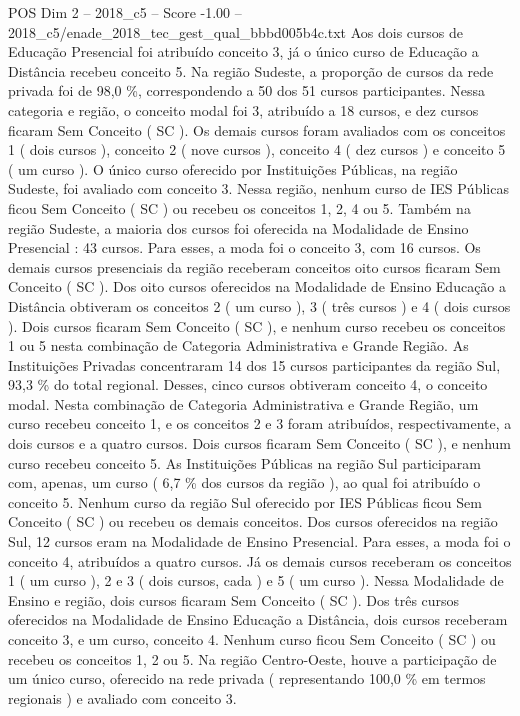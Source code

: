 \begin{textsample}{POS Dim 2 – 2018\_c5 – Score -1.00 – 2018\_c5/enade\_2018\_tec\_gest\_qual\_bbbd005b4c.txt}
Aos dois cursos de Educação Presencial foi atribuído conceito 3, já o único curso de Educação a Distância recebeu conceito 5.
Na região Sudeste, a proporção de cursos da rede privada foi de 98,0 \%, correspondendo a 50 dos 51 cursos participantes.
Nessa categoria e região, o conceito modal foi 3, atribuído a 18 cursos, e dez cursos ficaram Sem Conceito ( SC ).
Os demais cursos foram avaliados com os conceitos 1 ( dois cursos ), conceito 2 ( nove cursos ), conceito 4 ( dez cursos ) e conceito 5 ( um curso ).
O único curso oferecido por Instituições Públicas, na região Sudeste, foi avaliado com conceito 3.
Nessa região, nenhum curso de IES Públicas ficou Sem Conceito ( SC ) ou recebeu os conceitos 1, 2, 4 ou 5.
Também na região Sudeste, a maioria dos cursos foi oferecida na Modalidade de Ensino Presencial : 43 cursos.
Para esses, a moda foi o conceito 3, com 16 cursos.
Os demais cursos presenciais da região receberam conceitos oito cursos ficaram Sem Conceito ( SC ).
Dos oito cursos oferecidos na Modalidade de Ensino Educação a Distância obtiveram os conceitos 2 ( um curso ), 3 ( três cursos ) e 4 ( dois cursos ).
Dois cursos ficaram Sem Conceito ( SC ), e nenhum curso recebeu os conceitos 1 ou 5 nesta combinação de Categoria Administrativa e Grande Região.
As Instituições Privadas concentraram 14 dos 15 cursos participantes da região Sul, 93,3 \% do total regional.
Desses, cinco cursos obtiveram conceito 4, o conceito modal.
Nesta combinação de Categoria Administrativa e Grande Região, um curso recebeu conceito 1, e os conceitos 2 e 3 foram atribuídos, respectivamente, a dois cursos e a quatro cursos.
Dois cursos ficaram Sem Conceito ( SC ), e nenhum curso recebeu conceito 5.
As Instituições Públicas na região Sul participaram com, apenas, um curso ( 6,7 \% dos cursos da região ), ao qual foi atribuído o conceito 5.
Nenhum curso da região Sul oferecido por IES Públicas ficou Sem Conceito ( SC ) ou recebeu os demais conceitos.
Dos cursos oferecidos na região Sul, 12 cursos eram na Modalidade de Ensino Presencial.
Para esses, a moda foi o conceito 4, atribuídos a quatro cursos.
Já os demais cursos receberam os conceitos 1 ( um curso ), 2 e 3 ( dois cursos, cada ) e 5 ( um curso ).
Nessa Modalidade de Ensino e região, dois cursos ficaram Sem Conceito ( SC ).
Dos três cursos oferecidos na Modalidade de Ensino Educação a Distância, dois cursos receberam conceito 3, e um curso, conceito 4.
Nenhum curso ficou Sem Conceito ( SC ) ou recebeu os conceitos 1, 2 ou 5.
Na região Centro-Oeste, houve a participação de um único curso, oferecido na rede privada ( representando 100,0 \% em termos regionais ) e avaliado com conceito 3.

\end{textsample}
